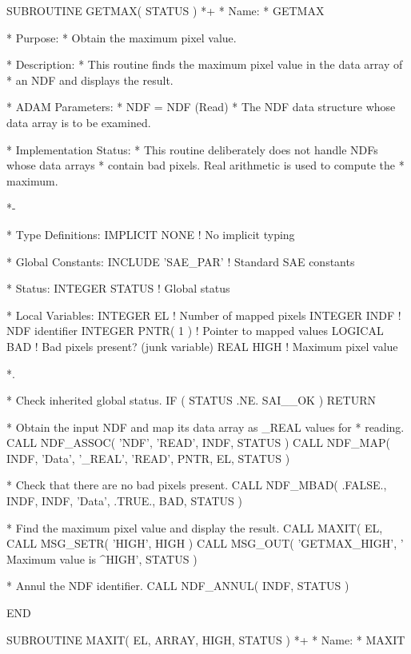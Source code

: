 \documentclass[twoside,11pt,nolof]{starlink}
\begin{document}
\small
\begin{terminalv}
      SUBROUTINE GETMAX( STATUS )
*+
*  Name:
*     GETMAX

*  Purpose:
*     Obtain the maximum pixel value.

*  Description:
*     This routine finds the maximum pixel value in the data array of
*     an NDF and displays the result.

*  ADAM Parameters:
*     NDF = NDF (Read)
*        The NDF data structure whose data array is to be examined.

*  Implementation Status:
*     This routine deliberately does not handle NDFs whose data arrays
*     contain bad pixels. Real arithmetic is used to compute the
*     maximum.

*-

*  Type Definitions:
      IMPLICIT NONE              ! No implicit typing

*  Global Constants:
      INCLUDE 'SAE_PAR'          ! Standard SAE constants

*  Status:
      INTEGER STATUS             ! Global status

*  Local Variables:
      INTEGER EL                 ! Number of mapped pixels
      INTEGER INDF               ! NDF identifier
      INTEGER PNTR( 1 )          ! Pointer to mapped values
      LOGICAL BAD                ! Bad pixels present? (junk variable)
      REAL HIGH                  ! Maximum pixel value

*.

*  Check inherited global status.
      IF ( STATUS .NE. SAI__OK ) RETURN

*  Obtain the input NDF and map its data array as _REAL values for
*  reading.
      CALL NDF_ASSOC( 'NDF', 'READ', INDF, STATUS )
      CALL NDF_MAP( INDF, 'Data', '_REAL', 'READ', PNTR, EL, STATUS )

*  Check that there are no bad pixels present.
      CALL NDF_MBAD( .FALSE., INDF, INDF, 'Data', .TRUE., BAD, STATUS )

*  Find the maximum pixel value and display the result.
      CALL MAXIT( EL, %
      CALL MSG_SETR( 'HIGH', HIGH )
      CALL MSG_OUT( 'GETMAX_HIGH', '   Maximum value is ^HIGH', STATUS )

*  Annul the NDF identifier.
      CALL NDF_ANNUL( INDF, STATUS )

      END

      SUBROUTINE MAXIT( EL, ARRAY, HIGH, STATUS )
*+
*  Name:
*     MAXIT


\end{terminalv}
\end{document}
